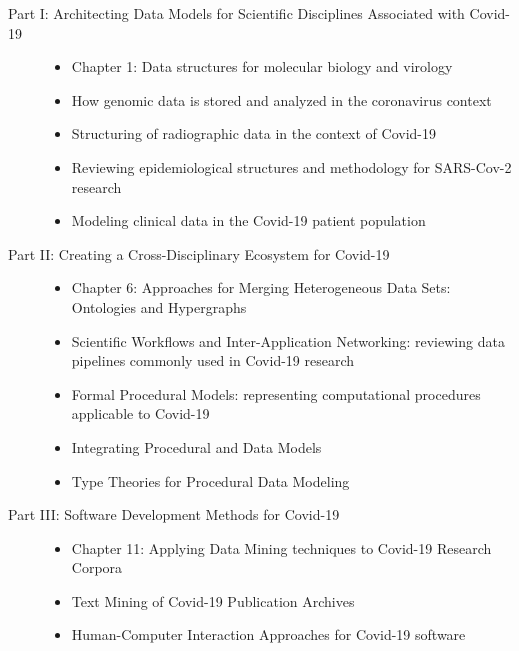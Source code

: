 \documentclass{statsoc}
\begin{document}
\begin{description}

\item[Part I: Architecting Data Models for Scientific Disciplines Associated with Covid-19]

\begin{itemize}
\item Chapter 1: Data structures for molecular biology and virology
\item How genomic data is stored and analyzed in the coronavirus context
\item Structuring of radiographic data in the context of Covid-19
\item Reviewing epidemiological structures and methodology for SARS-Cov-2 research
\item Modeling clinical data in the Covid-19 patient population  
\end{itemize}

\item[Part II: Creating a Cross-Disciplinary Ecosystem for Covid-19]

\begin{itemize}
\item Chapter 6: Approaches for Merging Heterogeneous Data Sets: Ontologies and Hypergraphs
\item Scientific Workflows and Inter-Application Networking: reviewing data pipelines commonly used in Covid-19 research
\item Formal Procedural Models: representing computational procedures applicable to Covid-19
\item Integrating Procedural and Data Models
\item Type Theories for Procedural Data Modeling
\end{itemize}

\item[Part III: Software Development Methods for Covid-19]

\begin{itemize}

\item Chapter 11: Applying Data Mining techniques to Covid-19 Research Corpora
\item Text Mining of Covid-19 Publication Archives
\item Human-Computer Interaction Approaches for Covid-19 software 

\end{itemize}

\end{description}
\end{document}
